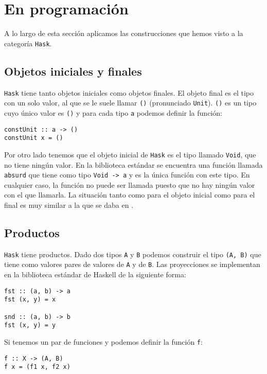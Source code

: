 \section{En programación}
A lo largo de esta sección aplicamos las construcciones que hemos visto
a la categoría \texttt{Hask}.

\subsection{Objetos iniciales y finales}
\texttt{Hask} tiene tanto objetos iniciales como objetos finales. El
objeto final es el tipo con un solo valor, al que se le suele llamar
\texttt{()} (pronunciado \texttt{Unit}). \texttt{()} es un tipo
cuyo único valor es \texttt{()} y para cada tipo \texttt{a} podemos
definir la función:
\begin{verbatim}
constUnit :: a -> ()
constUnit x = ()
\end{verbatim}
Por otro lado tenemos que el objeto inicial de \texttt{Hask} es el tipo
llamado \texttt{Void}, que no tiene ningún valor. En la biblioteca
estándar se encuentra una función llamada \texttt{absurd}
que tiene
como tipo \texttt{Void -> a} y es la única función con este tipo.
En cualquier caso, la función no puede ser llamada puesto que no
hay ningún valor con el que llamarla. La situación tanto como para
el objeto inicial como para el final es muy similar a la que se daba
en \Set.

\subsection{Productos}
\texttt{Hask} tiene productos. Dado dos tipos \texttt{A} y
\texttt{B} podemos construir el tipo \texttt{(A, B)} que tiene
como valores pares de valores de \texttt{A} y de \texttt{B}.
Las proyecciones se implementan en la biblioteca estándar de
Haskell de la siguiente forma:

\begin{verbatim}
fst :: (a, b) -> a
fst (x, y) = x

snd :: (a, b) -> b
fst (x, y) = y
\end{verbatim}

Si tenemos un par de funciones  y
 podemos definir la función \texttt{f}:
\begin{verbatim}
f :: X -> (A, B)
f x = (f1 x, f2 x)
\end{verbatim}

